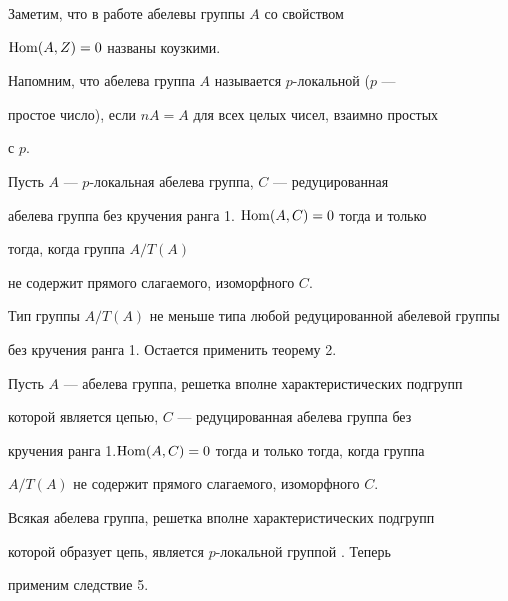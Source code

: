  


Заметим, что в работе \cite{1} абелевы группы $A$ со свойством 


$\operatorname{Hom}(A,Z)=0$ названы коузкими. 


 


Напомним, что абелева группа $A$ называется $p$-локальной ($p$ --- 


простое число), если $nA=A$ для всех целых чисел, взаимно простых 


с $p$. 


 


\begin{cor} 


Пусть $A$ --- $p$-локальная абелева группа, $C$ --- редуцированная 


абелева группа без кручения ранга 1.\; $\operatorname{Hom}(A,C)=0$ тогда и только 


тогда, когда группа $A/T(A)$ 


не содержит прямого слагаемого, изоморфного $C$. 


\end{cor} 


 


\begin{pf} 


Тип группы $A/T(A)$ не меньше типа любой редуцированной абелевой группы 


без кручения ранга 1. Остается применить теорему 2. 


\end{pf} 


 


\begin{cor} 


Пусть $A$ --- абелева группа, решетка вполне характеристических подгрупп 


которой является цепью, $C$ --- редуцированная абелева группа без 


кручения ранга 1.\linebreak $\operatorname{Hom}(A,C)=0$ тогда и только тогда, когда группа 


$A/T(A)$ не содержит прямого слагаемого, изоморфного $C$. 


\end{cor} 


 


\begin{pf} 


Всякая абелева группа, решетка вполне характеристических подгрупп 


которой образует цепь, является $p$-локальной группой \cite{5}. Теперь 


применим следствие 5. 


\end{pf} 


